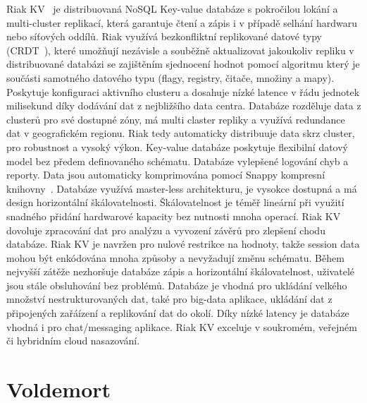 \documentclass[czech,bachelor,dept460,male,csharp,cpdeclaration]{diploma}
\begin{document}
	Riak KV~\cite{riak} je distribuovaná NoSQL Key-value databáze s pokročilou lokání a multi-cluster replikací, která garantuje čtení a zápis i v případě selhání hardwaru nebo síťových oddílů. Riak využívá bezkonfliktní replikované datové typy (CRDT~\cite{crdt}), které umožňují nezávisle a souběžně aktualizovat jakoukoliv repliku v distribuované databázi se zajištěním sjednocení hodnot pomocí algoritmu který je součásti samotného datového typu (flagy, registry, čitače, množiny a mapy). Poskytuje konfiguraci aktivního clusteru a dosahuje nízké latence v řádu jednotek milisekund díky dodávání dat z nejbližšího data centra. Databáze rozděluje data z clusterů pro své dostupné zóny, má multi claster repliky a využívá redundance dat v geografickém regionu. Riak tedy automaticky distribuuje data skrz cluster, pro robustnost a vysoký výkon. Key-value databáze poskytuje flexibilní datový model bez předem definovaného schématu. Databáze vylepšené logování chyb a reporty. Data jsou automaticky komprimována pomocí Snappy kompresní knihovny~\cite{snappy}. Databáze využívá master-less architekturu, je vysokce dostupná a má design horizontální škálovatelnosti. Škálovatelnost je téměř lineární při využití snadného přidání hardwarové kapacity bez nutnosti mnoha operací. Riak KV dovoluje zpracování dat pro analýzu a vyvození závěrů pro zlepšení chodu databáze. Riak KV je navržen pro nulové restrikce na hodnoty, takže session data mohou být enkódována mnoha způsoby a nevyžadují změnu schématu. Během nejvyšší zátěže nezhoršuje databáze zápis a horizontální škálovatelnost, uživatelé jsou stále obsluhování bez problémů. Databáze je vhodná pro ukládání velkého množství nestrukturovaných dat, také pro big-data aplikace, ukládání dat z připojených zařáízení a replikování dat do okolí. Díky nízké latency je databáze vhodná i pro chat/messaging aplikace. Riak KV exceluje v soukromém, veřejném či hybridním cloud nasazování.
	
	\section{Voldemort}
	
\end{document}
